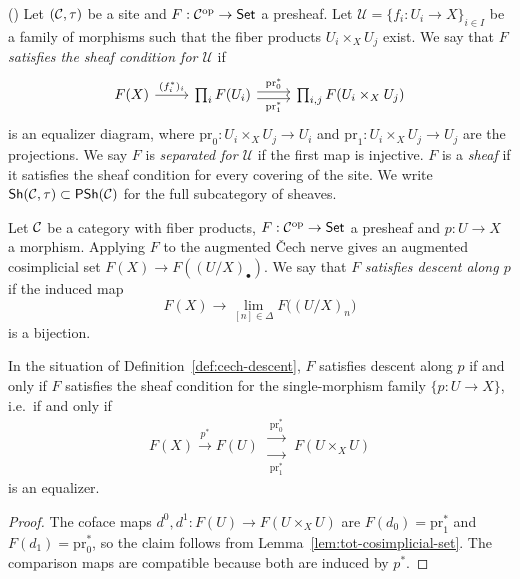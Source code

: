 \begin{definition}\label{def:sheaf-on-cite}
	(\cite[][Tag 00VM]{stacks-project})
	Let $(\mathcal{C},\tau)$ be a site and $F:\mathcal{C}^{\mathrm{op}}\to\mathsf{Set}$ a presheaf. Let $\mathcal{U}=\{f_i:U_i\to X\}_{i\in I}$ be a family of morphisms such that the fiber products $U_i\times_X U_j$ exist. We say that $F$ \emph{satisfies the sheaf condition for $\mathcal{U}$} if
	\begin{equation}\label{eq:sheaf-condition-equalizer}
		\begin{tikzcd}
			{F(X)} & {\prod_iF(U_i)} & {\prod_{i,j}F(U_i\times_X U_j)}
			\arrow["{(f_i^*)_i}", from=1-1, to=1-2]
			\arrow["{\mathrm{pr}_0^*}", shift left, from=1-2, to=1-3]
			\arrow["{\mathrm{pr}_1^*}"', shift right, from=1-2, to=1-3]
		\end{tikzcd}
	\end{equation}
	is an equalizer diagram, where $\mathrm{pr}_0:U_i\times_XU_j\to U_i$ and $\mathrm{pr}_1:U_i\times_XU_j\to U_j$ are the projections. We say $F$ is \emph{separated for $\mathcal{U}$} if the first map is injective. $F$ is a \emph{sheaf} if it satisfies the sheaf condition for every covering of the site. We write $\mathsf{Sh}\!\left(\mathcal{C},\tau\right)\subset\mathsf{PSh}\!\left(\mathcal{C}\right)$ for the full subcategory of sheaves.
\end{definition}

\begin{definition}\label{def:cech-descent}
	Let $\mathcal{C}$ be a category with fiber products, $F:\mathcal{C}^{\mathrm{op}}\to\mathsf{Set}$ a presheaf and $p:U\to X$ a morphism. Applying $F$ to the augmented \v{C}ech nerve gives an augmented cosimplicial set $F(X)\to F((U/X)_\bullet)$. We say that $F$ \emph{satisfies descent along $p$} if the induced map
	\[
	F(X)\longrightarrow\lim_{[n]\in\Delta}F\bigl((U/X)_n\bigr)
	\]
	is a bijection.
\end{definition}

\begin{proposition}\label{prop:cech-descent-equalizer}
	In the situation of Definition~\ref{def:cech-descent}, $F$ satisfies descent along $p$ if and only if $F$ satisfies the sheaf condition for the single-morphism family $\{p:U\to X\}$, i.e.\ if and only if
	\[
	F(X)\xrightarrow{\ p^*\ }F(U)\ \substack{\xrightarrow{\ \mathrm{pr}_0^*\ }\\[-0.2em]\xrightarrow[\ \mathrm{pr}_1^*\ ]{}}\ F(U\times_X U)
	\]
	is an equalizer.
\end{proposition}

\begin{proof}
	The coface maps $d^0,d^1:F(U)\to F(U\times_XU)$ are $F(d_0)=\mathrm{pr}_1^*$ and $F(d_1)=\mathrm{pr}_0^*$, so the claim follows from Lemma~\ref{lem:tot-cosimplicial-set}. The comparison maps are compatible because both are induced by $p^*$.
\end{proof}

